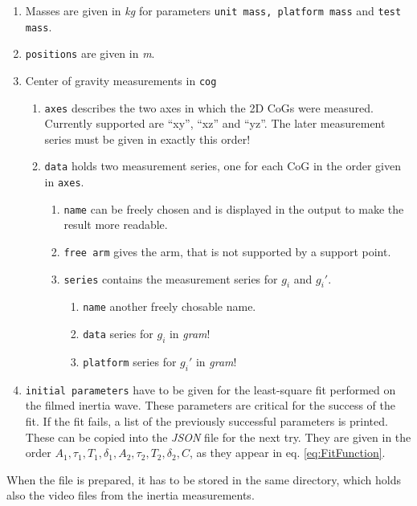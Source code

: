 \documentclass[journal]{IEEEtran}
\begin{document}
\begin{enumerate}
	\item Masses are given in \emph{kg} for parameters \texttt{unit mass, platform mass} and \texttt{test mass}.
	\item \texttt{positions} are given in \emph{m}.
	\item Center of gravity measurements in \texttt{cog}
		\begin{enumerate}
			\item \texttt{axes} describes the two axes in which the 2D CoGs were measured. Currently supported are ``xy'', ``xz'' and ``yz''. The later measurement series must be given in exactly this order!
			\item \texttt{data} holds two measurement series, one for each CoG in the order given in \texttt{axes}.
				\begin{enumerate}
					\item \texttt{name} can be freely chosen and is displayed in the output to make the result more readable.
					\item \texttt{free arm} gives the arm, that is not supported by a support point.
					\item \texttt{series} contains the measurement series for $g_i$ and $g_i'$.
						\begin{enumerate}
							\item \texttt{name} another freely chosable name.
							\item \texttt{data} series for $g_i$ in \emph{gram}!
							\item \texttt{platform} series for $g_i'$ in \emph{gram}!
						\end{enumerate}
				\end{enumerate}
		\end{enumerate}
	\item \texttt{initial parameters} have to be given for the least-square fit performed on the filmed inertia wave. These parameters are critical for the success of the fit. If the fit fails, a list of the previously successful parameters is printed. These can be copied into the \emph{JSON} file for the next try. They are given in the order $A_1, \tau_1, T_1, \delta_1, A_2, \tau_2, T_2, \delta_2, C$, as they appear in eq. \eqref{eq:FitFunction}.
\end{enumerate}

When the file is prepared, it has to be stored in the same directory, which holds also the video files from the inertia measurements.
\end{document}
